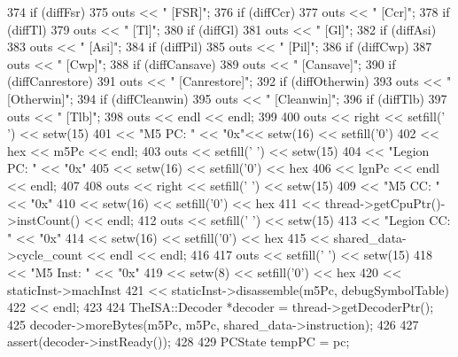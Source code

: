 \begin{DoxyCode}
{{{{{374                     if (diffFsr)
375                         outs << " [FSR]";
376                     if (diffCcr)
377                         outs << " [Ccr]";
378                     if (diffTl)
379                         outs << " [Tl]";
380                     if (diffGl)
381                         outs << " [Gl]";
382                     if (diffAsi)
383                         outs << " [Asi]";
384                     if (diffPil)
385                         outs << " [Pil]";
386                     if (diffCwp)
387                         outs << " [Cwp]";
388                     if (diffCansave)
389                         outs << " [Cansave]";
390                     if (diffCanrestore)
391                         outs << " [Canrestore]";
392                     if (diffOtherwin)
393                         outs << " [Otherwin]";
394                     if (diffCleanwin)
395                         outs << " [Cleanwin]";
396                     if (diffTlb)
397                         outs << " [Tlb]";
398                     outs << endl << endl;
399 
400                     outs << right << setfill(' ') << setw(15)
401                          << "M5 PC: " << "0x"<< setw(16) << setfill('0')
402                          << hex << m5Pc << endl;
403                     outs << setfill(' ') << setw(15)
404                          << "Legion PC: " << "0x"
405                          << setw(16) << setfill('0') << hex
406                          << lgnPc << endl << endl;
407 
408                     outs << right << setfill(' ') << setw(15)
409                          << "M5 CC: " << "0x"
410                          << setw(16) << setfill('0') << hex
411                          << thread->getCpuPtr()->instCount() << endl;
412                     outs << setfill(' ') << setw(15)
413                          << "Legion CC: " << "0x"
414                          << setw(16) << setfill('0') << hex
415                          << shared_data->cycle_count << endl << endl;
416 
417                     outs << setfill(' ') << setw(15)
418                          << "M5 Inst: " << "0x"
419                          << setw(8) << setfill('0') << hex
420                          << staticInst->machInst
421                          << staticInst->disassemble(m5Pc, debugSymbolTable)
422                          << endl;
423 
424                     TheISA::Decoder *decoder = thread->getDecoderPtr();
425                     decoder->moreBytes(m5Pc, m5Pc, shared_data->instruction);
426 
427                     assert(decoder->instReady());
428 
429                     PCState tempPC = pc;
}}}}}
\end{DoxyCode}
